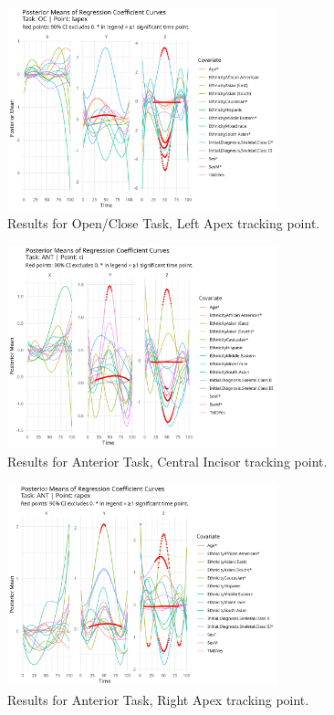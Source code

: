 \documentclass[AMA,Times1COL]{WileyNJDv5} %
\begin{document}
\begin{figure}[h]
    \centering
    \includegraphics[width = 0.7\textwidth]{oc_lapex_plot.jpeg}
    \caption{Results for Open/Close Task, Left Apex tracking point.}
    \label{fig:oc_lapex}
\end{figure}

\begin{figure}[h]
    \centering
    \includegraphics[width = 0.7\textwidth]{ant_ci_plot.jpeg}
    \caption{Results for Anterior Task, Central Incisor tracking point.}
    \label{fig:ant_ci}
\end{figure}

\begin{figure}[h]
    \centering
    \includegraphics[width = 0.7\textwidth]{ant_rapex_plot.jpeg}
    \caption{Results for Anterior Task, Right Apex tracking point.}
    \label{fig:ant_rapex}
\end{figure}
\end{document}
